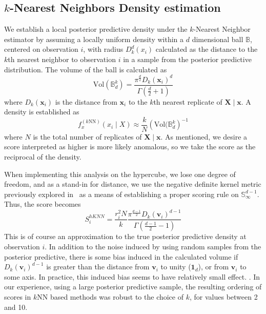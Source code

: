 \subsection{$k$-Nearest Neighbors Density estimation}
We establish a local posterior predictive density under the $k$-Nearest Neighbor 
    estimator \citep{mack1979} by
  assuming a locally uniform density within a $d$ dimensional ball $\mathbb{B}$, 
  centered on observation $i$, with radius $D_{k}^d(x_i)$ calculated as the 
  distance to the $k$th nearest neighbor to observation $i$ in a sample from the 
  posterior predictive distribution. The volume of the ball is calculated as
  \begin{equation}
    \label{eq:vol_sphere}
    \text{Vol}(\mathbb{B}_d^k) =
      \frac{\pi^{\frac{d}{2}}D_{k}(\bm{x}_i)^d}{\Gamma\left(\frac{d}{2} + 1\right)}
  \end{equation}
  where $D_k(\bm{x}_i)$ is the distance from $\bm{x}_i$ to the $k$th nearest 
  replicate of $\bm{X}\mid\bm{x}$.  A density is established as 
  \begin{equation}
    \label{eq:ad_knn}
    f_{x}^{(k\text{NN})}(x_i\mid X) \approx \frac{k}{N}\left(\text{Vol}(\mathbb{B}_d^k\right)^{-1}
    \end{equation}
  where $N$ is the total number of replicates of $\bm{X}\mid\bm{x}$.  As 
  mentioned, we desire a score interpreted as higher is more likely anomalous, 
  so we take the score as the reciprocal of the density.

When implementing this analysis on the hypercube, we lose one degree of freedom,
  and as a stand-in for distance, we use the negative definite kernel metric 
  previously explored in~\cite{trubey:pg} as a means of establishing a proper 
  scoring rule on $\mathbb{S}_{\infty}^{d-1}$.  Thus, the score becomes
  \begin{equation}
    \label{eq:ad_knn_h}
    S_i^{hKNN} = \frac{r_i^{2}N}{k}
    \frac{\pi^{\frac{d-1}{2}}D_{k}(\bm{v}_i)^{d-1}}{\Gamma\left(\frac{d-1}{2} - 1\right)}
  \end{equation}
  This is of course an approximation to the true posterior predictive density at
  observation $i$.  In addition to the noise induced by using random samples
  from the posterior predictive, there is some bias induced in the calculated volume
  if $D_k(\bm{v}_i)^{d-1}$ is greater than the distance from $\bm{v}_i$ to 
  unity ($\bm{1}_d$), or from $\bm{v}_i$ to some axis.  In practice,
  this induced bias seems to have relatively small effect. 
  .
  In our experience, using a large posterior predictive sample, the resulting 
  ordering of scores in $k$NN based methods was robust to the choice of $k$, for 
  values between 2 and 10.

